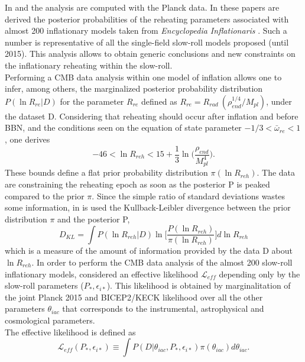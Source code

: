 \documentclass[11pt,a4paper,twoside]{book}
\begin{document}
In \cite{Chap3:Martin_Observing_Reheating} and \cite{Chap3:Martin_Milestone} the analysis are computed with the Planck data. In these papers are derived the posterior probabilities of the reheating parameters associated with almost 200 inflationary models taken from \textit{Encyclopedia Inflationaris} \cite{Chap3:EncyclopediaInflationaris}. Such a number is representative of all the single-field slow-roll models proposed (until 2015). This analysis allows to obtain  generic conclusions and new constraints on the inflationary reheating within the slow-roll.\\
 Performing a CMB data analysis within one model of inflation allows one to infer, among others, the marginalized posterior probability distribution $ P(\ln R_{re}|D
) $ for the parameter $ R_{re} $ defined as $R_{re}=R_{rad}\ (\rho_{end}^{1/4}/M_{pl})  $, under the dataset D.  Considering that reheating should occur after inflation and before BBN, and the conditions seen on the equation of state parameter $ -1/3 < \bar{\omega}_{re} < 1 $, one derives
\begin{equation}
	\label{Chap3:PriorChoiche}
	-46 < \ln R_{reh} < 15 + \frac{1}{3}\ln\Bigg( \frac{\rho_{end}}{M_{pl}^{4}}\Bigg).
\end{equation}
These bounds define a flat prior probability distribution $ \pi(\ln R_{reh}) $. The data are constraining the reheating epoch as soon as the posterior P is peaked compared to the prior $\pi$. Since the simple ratio of standard deviations wastes some information, in \cite{Chap3:Martin_Milestone}  is used the Kullback-Leibler divergence between the prior distribution $\pi$ and the posterior P,
\begin{equation}
\label{Chap3:KullbackLeiblerDivergence}
D_{KL}=\int P(\ln R_{reh}|D)\ln \Bigg[\frac{P(\ln R_{reh})}{\pi(\ln R_{reh})}\Bigg]d \ln R_{reh}
\end{equation}
which is a measure of the amount of information provided by the data D about $ \ln R_{reh} $.
In order to perform the CMB data analysis of the almost 200 slow-roll inflationary models, \cite{Chap3:Martin_Milestone} considered an effective likelihood $\mathcal{L}_{eff}$ depending  only by the slow-roll parameters ($ P_{*},\epsilon_{i*} $). This likelihood is obtained by marginalitation of the joint Planck 2015 and BICEP2/KECK likelihood over all the other parameters $ \theta_{iac} $ that corresponds to the instrumental, astrophysical and cosmological parameters.\\
The effective likelihood is defined as 
\begin{equation}
\label{Chap3:effectiveLikelihood}
\mathcal{L}_{eff}(P_{*},\epsilon_{i*}) \equiv \int P(D|\theta_{iac}, P_{*}, \epsilon_{i*})\pi(\theta_{iac})d\theta_{iac}.
\end{equation} 
\end{document}
